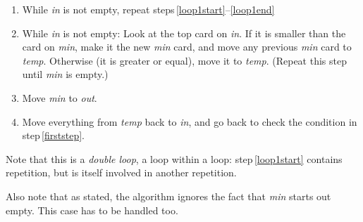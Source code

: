 \documentclass[a4paper,twoside]{tufte-handout}
\begin{document}
\begin{enumerate}
\item\label{firststep} While \emph{in} is not empty, repeat steps\,\ref{loop1start}--\ref{loop1end} \\
\item\label{loop1start} While \emph{in} is not empty:
  Look at the top card on \emph{in}. If it is smaller than the card on
  \emph{min}, make it the new \emph{min} card, and move any
  previous \emph{min} card to \emph{temp}. Otherwise (it is greater or
  equal), move it to \emph{temp}. (Repeat this step until \emph{min}
  is empty.)
\item Move \emph{min} to \emph{out}.
\item\label{loop1end} Move everything from \emph{temp} back to
  \emph{in}, and go back to check the condition in step\,\ref{firststep}.
\end{enumerate}

Note that this is a \emph{double loop}, a loop within a loop:
step\,\ref{loop1start} contains repetition, but is itself involved in
another repetition.

Also note that as stated, the algorithm ignores the fact that
\emph{min} starts out empty. This case has to be handled too.
\end{document}

